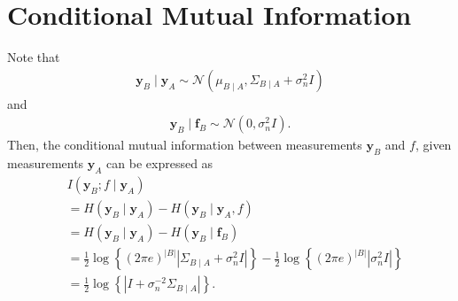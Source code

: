 \documentclass{article}
\def\*#1{\bm{#1}}
\begin{document}
\section{Conditional Mutual Information}
Note that
\begin{align*}
\*y_B\mid \*y_A \sim \mathcal{N}\left(\mu_{B\mid A}, \Sigma_{B\mid A} + \sigma_n^2 I\right)
\end{align*}
and
\begin{align*}
\*y_B\mid \*f_B \sim \mathcal{N}\left(0, \sigma_n^2 I\right).
\end{align*}
Then, the conditional mutual information between measurements $\*y_B$ and $f$,
given measurements $\*y_A$ can be expressed as
\begin{align*}
&I(\*y_B; f \mid \*y_A)\\
&=H(\*y_B\mid \*y_A) - H(\*y_B\mid \*y_A, f)\\
&=H(\*y_B\mid \*y_A) - H(\*y_B\mid \*f_B)\\
&=\frac{1}{2}\log\left\{(2\pi e)^{|B|}\left|\Sigma_{B\mid A} + \sigma_n^2 I\right|\right\} -
  \frac{1}{2}\log\left\{(2\pi e)^{|B|}\left|\sigma_n^2 I\right|\right\}\\
&=\frac{1}{2}\log\left\{\left|I + \sigma_n^{-2}\Sigma_{B\mid A}\right|\right\}.
\end{align*}
\end{document}
